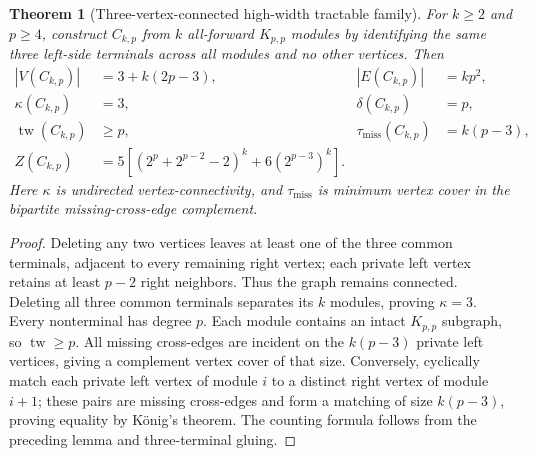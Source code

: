 \documentclass[11pt]{article}
\newtheorem{theorem}{Theorem}
\begin{document}
\begin{theorem}[Three-vertex-connected high-width tractable family]
For $k\ge2$ and $p\ge4$, construct $C_{k,p}$ from $k$ all-forward
$K_{p,p}$ modules by identifying the same three left-side
terminals across all modules and no other vertices. Then
\[
\begin{aligned}
|V(C_{k,p})|&=3+k(2p-3),&
|E(C_{k,p})|&=kp^2,\\
\kappa(C_{k,p})&=3,&
\delta(C_{k,p})&=p,\\
\operatorname{tw}(C_{k,p})&\ge p,&
\tau_{\mathrm{miss}}(C_{k,p})&=k(p-3),\\
Z(C_{k,p})&=5\left[
 (2^p+2^{p-2}-2)^k+6(2^{p-3})^k
 \right].
\end{aligned}
\]
Here $\kappa$ is undirected vertex-connectivity, and
$\tau_{\mathrm{miss}}$ is minimum vertex cover in the bipartite
missing-cross-edge complement.
\end{theorem}
\begin{proof}
Deleting any two vertices leaves at least one of the three
common terminals, adjacent to every remaining right vertex;
each private left vertex retains at least $p-2$ right
neighbors. Thus the graph remains connected. Deleting all
three common terminals separates its $k$ modules, proving
$\kappa=3$. Every nonterminal has degree $p$.
Each module contains an intact $K_{p,p}$ subgraph, so
$\operatorname{tw}\ge p$. All missing cross-edges are incident
on the $k(p-3)$ private left vertices, giving a complement
vertex cover of that size. Conversely, cyclically match each
private left vertex of module $i$ to a distinct right vertex
of module $i+1$; these pairs are missing cross-edges and
form a matching of size $k(p-3)$, proving equality by
K\"onig's theorem. The counting formula follows from the
preceding lemma and three-terminal gluing.
\end{proof}
\end{document}

